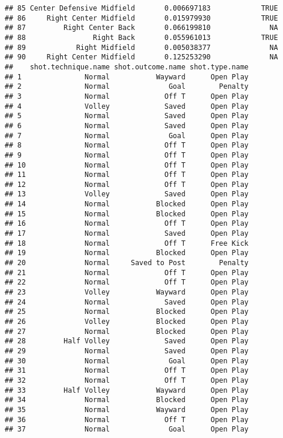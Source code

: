 \documentclass[]{article}
\begin{document}
\begin{verbatim}
## 85 Center Defensive Midfield       0.006697183            TRUE
## 86     Right Center Midfield       0.015979930            TRUE
## 87         Right Center Back       0.066199810              NA
## 88                Right Back       0.055961013            TRUE
## 89            Right Midfield       0.005038377              NA
## 90     Right Center Midfield       0.125253290              NA
##    shot.technique.name shot.outcome.name shot.type.name
## 1               Normal           Wayward      Open Play
## 2               Normal              Goal        Penalty
## 3               Normal             Off T      Open Play
## 4               Volley             Saved      Open Play
## 5               Normal             Saved      Open Play
## 6               Normal             Saved      Open Play
## 7               Normal              Goal      Open Play
## 8               Normal             Off T      Open Play
## 9               Normal             Off T      Open Play
## 10              Normal             Off T      Open Play
## 11              Normal             Off T      Open Play
## 12              Normal             Off T      Open Play
## 13              Volley             Saved      Open Play
## 14              Normal           Blocked      Open Play
## 15              Normal           Blocked      Open Play
## 16              Normal             Off T      Open Play
## 17              Normal             Saved      Open Play
## 18              Normal             Off T      Free Kick
## 19              Normal           Blocked      Open Play
## 20              Normal     Saved to Post        Penalty
## 21              Normal             Off T      Open Play
## 22              Normal             Off T      Open Play
## 23              Volley           Wayward      Open Play
## 24              Normal             Saved      Open Play
## 25              Normal           Blocked      Open Play
## 26              Volley           Blocked      Open Play
## 27              Normal           Blocked      Open Play
## 28         Half Volley             Saved      Open Play
## 29              Normal             Saved      Open Play
## 30              Normal              Goal      Open Play
## 31              Normal             Off T      Open Play
## 32              Normal             Off T      Open Play
## 33         Half Volley           Wayward      Open Play
## 34              Normal           Blocked      Open Play
## 35              Normal           Wayward      Open Play
## 36              Normal             Off T      Open Play
## 37              Normal              Goal      Open Play

\end{verbatim}
\end{document}
